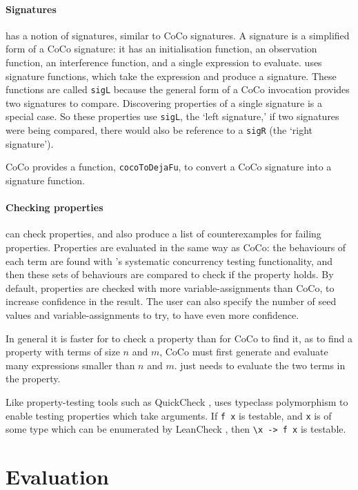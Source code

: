 \paragraph{Signatures}
\dejafu{} has a notion of signatures, similar to CoCo signatures.  A
\dejafu{} signature is a simplified form of a CoCo signature: it has
an initialisation function, an observation function, an interference
function, and a single expression to evaluate.  
uses signature functions, which take the expression and produce a
signature.  These functions are called \texttt{sigL} because the
general form of a CoCo invocation provides two signatures to compare.
Discovering properties of a single signature is a special case.  So
these properties use \verb|sigL|, the `left signature,' if two
signatures were being compared, there would also be reference to a
\texttt{sigR} (the `right signature').

CoCo provides a function, \texttt{cocoToDejaFu}, to convert a CoCo
signature into a \dejafu{} signature function.

\paragraph{Checking properties}
\dejafu{} can check properties, and also produce a list of
counterexamples for failing properties.  Properties are evaluated in
the same way as CoCo: the behaviours of each term are found with
\dejafu{}'s systematic concurrency testing functionality, and then
these sets of behaviours are compared to check if the property holds.
By default, properties are checked with more variable-assignments than
CoCo, to increase confidence in the result.  The user can also specify
the number of seed values and variable-assignments to try, to have
even more confidence.

In general it is faster for \dejafu{} to check a property than for
CoCo to find it, as to find a property with terms of size $n$ and $m$,
CoCo must first generate and evaluate many expressions smaller than
$n$ and $m$.  \dejafu{} just needs to evaluate the two terms in the
property.

Like property-testing tools such as QuickCheck \parencite{claessen2000},
\dejafu{} uses typeclass polymorphism to enable testing properties
which take arguments.  If \texttt{f x} is testable, and \texttt{x} is
of some type which can be enumerated by LeanCheck \parencite{leancheck},
then \verb|\x -> f x| is testable.

\section{Evaluation}
\label{sec:coco-conclusions}

